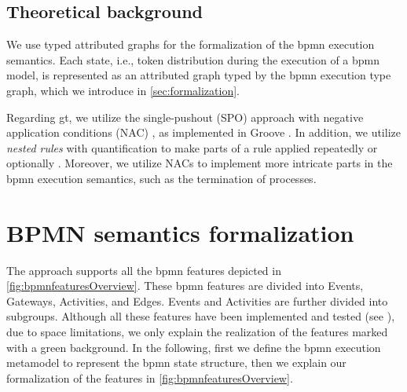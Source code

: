 \documentclass[runningheads]{llncs}
\begin{document}
\subsection{Theoretical background}
We use typed attributed graphs for the formalization of the \gls*{bpmn} execution semantics.
Each state, i.e., token distribution during the execution of a \gls*{bpmn} model, is represented as an attributed graph typed by the \gls*{bpmn} execution type graph, which we introduce in \autoref{sec:formalization}.

Regarding \gls*{gt}, we utilize the single-pushout (SPO) approach with negative application conditions (NAC) \cite{ehrigALGEBRAICAPPROACHESGRAPH1997}, as implemented in Groove \cite{rensinkGROOVESimulatorTool2004}.
In addition, we utilize \textit{nested rules} with quantification to make parts of a rule applied repeatedly or optionally \cite{rensinkNestedQuantificationGraph2006,rensinkHowMuchAre2017}.
Moreover, we utilize NACs to implement more intricate parts in the \gls*{bpmn} execution semantics, such as the termination of processes.


\section{BPMN semantics formalization} \label{sec:formalization}

The approach supports all the \gls*{bpmn} features depicted in \autoref{fig:bpmnfeaturesOverview}.
These \gls*{bpmn} features are divided into \textsf{Events}, \textsf{Gateways}, \textsf{Activities}, and \textsf{Edges}.
\textsf{Events} and \textsf{Activities} are further divided into subgroups.
Although all these features have been implemented and tested (see \cite{krauterArtifactsICGT2023}), due to space limitations, we only explain the realization of the features marked with a green background.
In the following, first we define the \gls*{bpmn} execution metamodel to represent the \gls*{bpmn} state structure, then we explain our formalization of the features in \autoref{fig:bpmnfeaturesOverview}.
\end{document}
